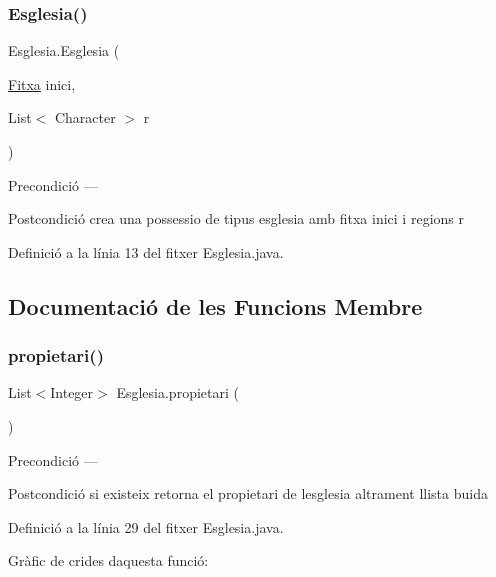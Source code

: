 \subsubsection{\texorpdfstring{Esglesia()}{Esglesia()}}
{\footnotesize\ttfamily Esglesia.\+Esglesia (\begin{DoxyParamCaption}\item[{\mbox{\hyperlink{class_fitxa}{Fitxa}}}]{inici,  }\item[{List$<$ Character $>$}]{r }\end{DoxyParamCaption})}

\begin{DoxyPrecond}{Precondició}
--- 
\end{DoxyPrecond}
\begin{DoxyPostcond}{Postcondició}
crea una possessio de tipus esglesia amb fitxa inici i regions r 
\end{DoxyPostcond}


Definició a la línia 13 del fitxer Esglesia.\+java.



\subsection{Documentació de les Funcions Membre}
\mbox{\label{class_esglesia_a2048c0dd48f7065274dbf4ba4983358b}} 
\subsubsection{\texorpdfstring{propietari()}{propietari()}}
{\footnotesize\ttfamily List$<$Integer$>$ Esglesia.\+propietari (\begin{DoxyParamCaption}{ }\end{DoxyParamCaption})}

\begin{DoxyPrecond}{Precondició}
--- 
\end{DoxyPrecond}
\begin{DoxyPostcond}{Postcondició}
si existeix retorna el propietari de l\textquotesingle{}esglesia altrament llista buida 
\end{DoxyPostcond}


Definició a la línia 29 del fitxer Esglesia.\+java.

Gràfic de crides d\textquotesingle{}aquesta funció\+:
\mbox{\label{class_esglesia_ae5bce92364b7865d9683b2cba97b34a8}} 
